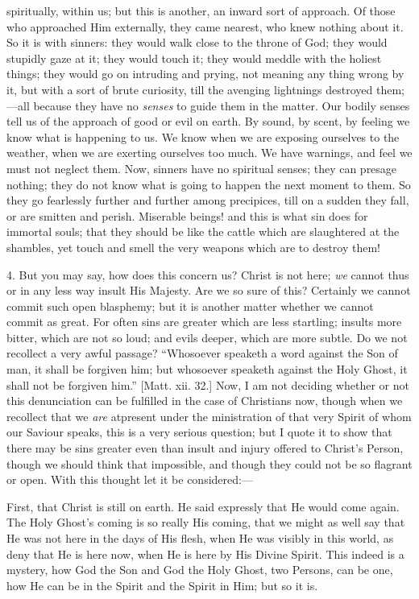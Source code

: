 spiritually, within us; but this is another, an inward sort of
approach. Of those who approached Him externally, they came nearest,
who knew nothing about it. So it is with sinners: they would walk
close to the throne of God; they would stupidly gaze at it; they would
touch it; they would meddle with the holiest things; they would go on
intruding and prying, not meaning any thing wrong by it, but with a
sort of brute curiosity, till the avenging lightnings destroyed them;—all
because they have no \emph{senses} to guide them in the matter. Our
bodily senses tell us of the approach of good or evil on earth. By
sound, by scent, by feeling we know what is happening to us. We know
when we are exposing ourselves to the weather, when we are exerting
ourselves too much. We have warnings, and feel we must not neglect
them. Now, sinners have no spiritual senses; they can presage nothing;
they do not know what is going to happen the next moment to them. So
they go fearlessly further and further among precipices, till on a
sudden they fall, or are smitten and perish. Miserable beings! and
this is what sin does for immortal souls; that they should be like the
cattle which are slaughtered at the shambles, yet touch and smell the
very weapons which are to destroy them!

4. But you may say, how does this concern us? Christ is not here; \emph{we}
cannot thus or in any less way insult His Majesty. Are we so sure of
this? Certainly we cannot commit such open blasphemy; but it is
another matter whether we cannot commit as great. For often sins are
greater which are less startling; insults more bitter, which are not
so loud; and evils deeper, which are more subtle. Do we not recollect
a very awful passage? ``Whosoever speaketh a word against the Son
of man, it shall be forgiven him; but whosoever speaketh against the
Holy Ghost, it shall not be forgiven him.'' [Matt. xii. 32.] Now,
I am not deciding whether or not this denunciation can be fulfilled in
the case of Christians now, though when we recollect that we \emph{are}
at\emph{}present under the ministration of that very Spirit of whom
our Saviour speaks, this is a very serious question; but I quote it to
show that there may be sins greater even than insult and injury
offered to Christ's Person, though we should think that impossible,
and though they could not be so flagrant or open. With this thought
let it be considered:—

First, that Christ is still on earth. He said expressly that He
would come again. The Holy Ghost's coming is so really His coming,
that we might as well say that He was not here in the days of His
flesh, when He was visibly in this world, as deny that He is here now,
when He is here by His Divine Spirit. This indeed is a mystery, how
God the Son and God the Holy Ghost, two Persons, can be one, how He
can be in the Spirit and the Spirit in Him; but so it is.

